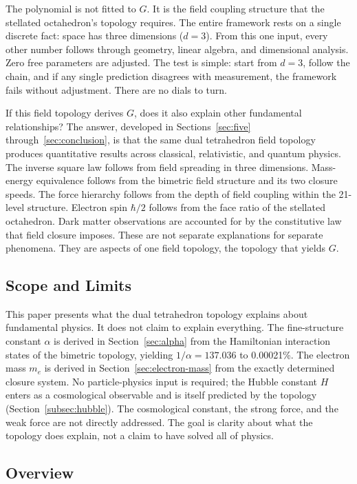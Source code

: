 \documentclass[aps,prd,preprint,superscriptaddress,showpacs,preprintnumbers,amsmath,amssymb,nofootinbib]{revtex4-2}
\begin{document}
The polynomial is not fitted to $G$. It is the field coupling structure that the stellated octahedron's topology requires. The entire framework rests on a single discrete fact: space has three dimensions ($d = 3$). From this one input, every other number follows through geometry, linear algebra, and dimensional analysis. Zero free parameters are adjusted. The test is simple: start from $d = 3$, follow the chain, and if any single prediction disagrees with measurement, the framework fails without adjustment. There are no dials to turn.

If this field topology derives $G$, does it also explain other fundamental relationships? The answer, developed in Sections~\ref{sec:five} through~\ref{sec:conclusion}, is that the same dual tetrahedron field topology produces quantitative results across classical, relativistic, and quantum physics. The inverse square law follows from field spreading in three dimensions. Mass-energy equivalence follows from the bimetric field structure and its two closure speeds. The force hierarchy follows from the depth of field coupling within the 21-level structure. Electron spin $\hbar/2$ follows from the face ratio of the stellated octahedron. Dark matter observations are accounted for by the constitutive law that field closure imposes. These are not separate explanations for separate phenomena. They are aspects of one field topology, the topology that yields $G$.

\subsection{Scope and Limits}
\label{subsec:limits}

This paper presents what the dual tetrahedron topology explains about fundamental physics. It does not claim to explain everything. The fine-structure constant $\alpha$ is derived in Section~\ref{sec:alpha} from the Hamiltonian interaction states of the bimetric topology, yielding $1/\alpha = 137.036$ to 0.00021\%. The electron mass $m_e$ is derived in Section~\ref{sec:electron-mass} from the exactly determined closure system. No particle-physics input is required; the Hubble constant $H$ enters as a cosmological observable and is itself predicted by the topology (Section~\ref{subsec:hubble}). The cosmological constant, the strong force, and the weak force are not directly addressed. The goal is clarity about what the topology does explain, not a claim to have solved all of physics.

\subsection{Overview}
\label{subsec:structure}
\end{document}
